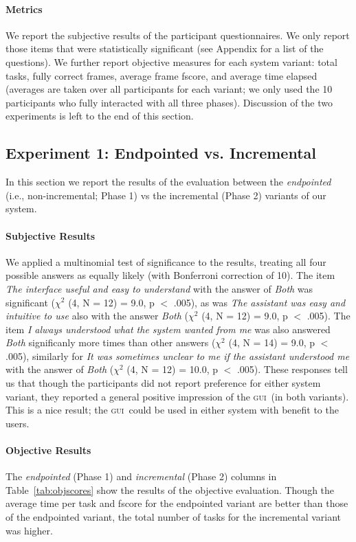 \documentclass[11pt]{article}
\newcommand{\ui}[0]{\textsc{gui}}
\begin{document}
\paragraph{Metrics} We report the subjective results of the participant questionnaires. We only report those items that were statistically significant (see Appendix for a list of the questions). We further report objective measures for each system variant: total tasks, fully correct frames, average frame fscore, and average time elapsed (averages are taken over all participants for each variant; we only used the 10 participants who fully interacted with all three phases). Discussion of the two experiments is left to the end of this section.

\subsection{Experiment 1: Endpointed vs. Incremental}
\label{section:exp1}

In this section we report the results of the evaluation between the \emph{endpointed} (i.e., non-incremental; Phase 1) vs the incremental (Phase 2) variants of our system.

\paragraph{Subjective Results} We applied a multinomial test of significance to the results, treating all four possible answers as equally likely (with Bonferroni correction of 10). The item \emph{The interface useful and easy to understand} with the answer of \emph{Both} was significant ($ \chi^2 $ (4, N = 12) = 9.0, p $<$ .005), as was \emph{The assistant was easy and intuitive to use} also with the answer \emph{Both} ($ \chi^2 $ (4, N = 12) = 9.0, p $<$ .005). The item \emph{I always understood what the system wanted from me} was also answered \emph{Both} significanly more times than other answers ($ \chi^2 $ (4, N = 14) = 9.0, p $<$ .005), similarly for \emph{It was sometimes unclear to me if the assistant understood me} with the answer of \emph{Both} ($ \chi^2 $ (4, N = 12) = 10.0, p $<$ .005).  These responses tell us that though the participants did not report preference for either system variant, they reported a general positive impression of the \ui\ (in both variants). This is a nice result; the \ui\ could be used in either system with benefit to the users.

\paragraph{Objective Results}  The \emph{endpointed} (Phase 1) and \emph{incremental} (Phase 2) columns in Table~\ref{tab:objscores} show the results of the objective evaluation. Though the average time per task and fscore for the endpointed variant are better than those of the endpointed variant, the total number of tasks for the incremental variant was higher. 
\end{document}
